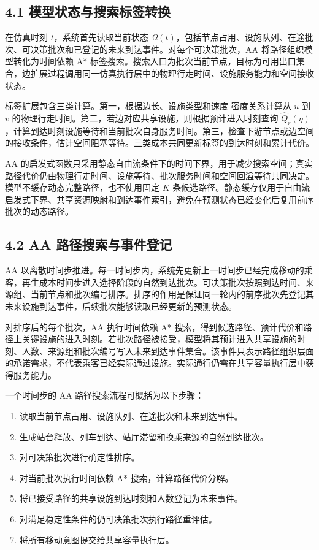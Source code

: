 \documentclass[UTF8,a4paper,12pt]{ctexart}
\begin{document}
\subsection{4.1 模型状态与搜索标签转换}

在仿真时刻 \(t\)，系统首先读取当前状态 \(\Omega(t)\)，包括节点占用、设施队列、在途批次、可决策批次和已登记的未来到达事件。对每个可决策批次，AA 将路径组织模型转化为时间依赖 A* 标签搜索。搜索入口为批次当前节点，目标为可用出口集合，边扩展过程调用同一仿真执行层中的物理行走时间、设施服务能力和空间接收状态。

标签扩展包含三类计算。第一，根据边长、设施类型和速度-密度关系计算从 \(u\) 到 \(v\) 的物理行走时间。第二，若边对应共享设施，则根据预计进入时刻查询 \(\widehat Q_r(\eta)\)，计算到达时刻设施等待和当前批次自身服务时间。第三，检查下游节点或边空间的接收条件，估计空间阻塞等待。三类成本共同更新标签的到达时刻和累计代价。

AA 的启发式函数只采用静态自由流条件下的时间下界，用于减少搜索空间；真实路径代价仍由物理行走时间、设施等待、批次服务时间和空间回溢等待共同决定。模型不缓存动态完整路径，也不使用固定 \(K\) 条候选路径。静态缓存仅用于自由流启发式下界、共享资源映射和到达事件索引，避免在预测状态已经变化后复用前序批次的动态路径。

\subsection{4.2 AA 路径搜索与事件登记}

AA 以离散时间步推进。每一时间步内，系统先更新上一时间步已经完成移动的乘客，再生成本时间步进入选择阶段的自然到达批次。可决策批次按照到达时间、来源组、当前节点和批次编号排序。排序的作用是保证同一轮内的前序批次先登记其未来设施到达事件，后续批次能够读取已经更新的预测状态。

对排序后的每个批次，AA 执行时间依赖 A* 搜索，得到候选路径、预计代价和路径上关键设施的进入时刻。若批次路径被接受，模型将其预计进入共享设施的时刻、人数、来源组和批次编号写入未来到达事件集合。该事件只表示路径组织层面的承诺需求，不代表乘客已经实际通过设施。实际通行仍需在共享容量执行层中获得服务能力。

一个时间步的 AA 路径搜索流程可概括为以下步骤：
\begin{enumerate}
    \item 读取当前节点占用、设施队列、在途批次和未来到达事件。
    \item 生成站台释放、列车到达、站厅滞留和换乘来源的自然到达批次。
    \item 对可决策批次进行确定性排序。
    \item 对当前批次执行时间依赖 A* 搜索，计算路径代价分解。
    \item 将已接受路径的共享设施到达时刻和人数登记为未来事件。
    \item 对满足稳定性条件的仍可决策批次执行路径重评估。
    \item 将所有移动意图提交给共享容量执行层。
\end{enumerate}
\end{document}
